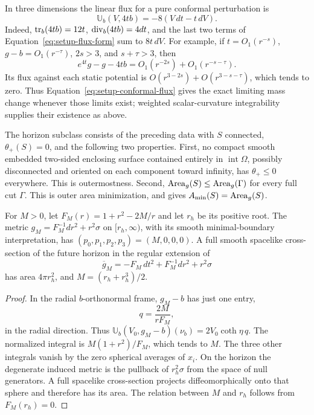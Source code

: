 \begin{remark}\label{rem:setup-conformal-flux}
In three dimensions the linear flux for a pure conformal perturbation is
\begin{equation}\label{eq:setup-conformal-flux}
 \mathbb U_b(V,4t b)=-8(V\,dt-t\,dV).
\end{equation}
Indeed, $\operatorname{tr}_b(4tb)=12t$, $\operatorname{div}_b(4tb)=4dt$, and the last two terms
of Equation~\ref{eq:setup-flux-form} sum to $8t\,dV$.
For example, if $t=O_1(r^{-s})$, $g-b=O_1(r^{-\tau})$,
$2s>3$, and $s+\tau>3$, then
\[
 e^{4t}g-g-4tb=O_1(r^{-2s})+O_1(r^{-s-\tau}).
\]
Its flux against each static potential is
$O(r^{3-2s})+O(r^{3-s-\tau})$, which tends to zero.
Thus Equation~\eqref{eq:setup-conformal-flux} gives the exact limiting
mass change whenever those limits exist; weighted scalar-curvature
integrability supplies their existence as above.
\end{remark}

\begin{definition}\label{def:setup-horizon}
The horizon subclass consists of the preceding data with $S$ connected,
$\theta_+(S)=0$, and the following two properties. First, no compact
smooth embedded two-sided enclosing surface contained entirely in
$\operatorname{int}\Omega$, possibly disconnected and oriented on each
component toward infinity, has $\theta_+\le0$ everywhere. This is
outermostness. Second,
$\operatorname{Area}_g(S)\le\operatorname{Area}_g(\Gamma)$ for every full cut $\Gamma$.
This is outer area minimization, and gives
$A_{\min}(S)=\operatorname{Area}_g(S)$.
\end{definition}

\begin{lemma}\label{lem:setup-model-mass}
For $M>0$, let $F_M(r)=1+r^2-2M/r$ and let $r_h$ be its positive root.
The metric $g_M=F_M^{-1}dr^2+r^2\sigma$ on $[r_h,\infty)$, with
its smooth minimal-boundary interpretation, has
$(p_0,p_1,p_2,p_3)=(M,0,0,0)$. A full smooth spacelike cross-section
of the future horizon in the regular extension of
\begin{equation}\label{eq:setup-model-spacetime}
 \overline g_M=-F_M\,dt^2+F_M^{-1}dr^2+r^2\sigma
\end{equation}
has area $4\pi r_h^2$, and
$M=(r_h+r_h^3)/2$.
\end{lemma}

\begin{proof}
In the radial $b$-orthonormal frame, $g_M-b$ has just one entry,
\[
 q=\frac{2M}{rF_M},
\]
in the radial direction. Thus
$\mathbb U_b(V_0,g_M-b)(\nu_b)=2V_0\coth\eta\,q$.
The normalized integral is $M(1+r^2)/F_M$, which tends to $M$.
The three other integrals vanish by the zero spherical averages of
$x_i$. On the horizon the degenerate induced metric is the pullback of
$r_h^2\sigma$ from the space of null generators. A full spacelike
cross-section projects diffeomorphically onto that sphere and therefore
has its area. The relation between $M$ and $r_h$ follows from $F_M(r_h)=0$.
\end{proof}

